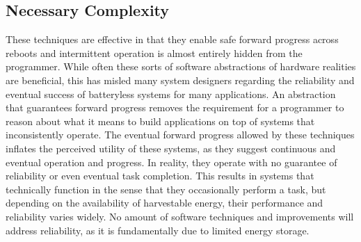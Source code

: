 \subsection{Necessary Complexity}
These techniques are effective in that they enable safe forward progress across reboots and intermittent operation is almost entirely hidden from the programmer.
While often these sorts of software abstractions of hardware realities are beneficial, this has misled many system designers regarding the reliability and eventual success of batteryless systems for many applications.
An abstraction that guarantees forward progress removes the requirement for a programmer to
reason about what it means to build applications on top of systems that inconsistently operate.
The eventual forward progress allowed by these techniques inflates the perceived utility of these systems,
as they suggest continuous and eventual operation and progress. In reality, they operate with no guarantee of reliability or even eventual task completion.
This results in systems that technically function in the sense that they occasionally perform a task, but depending on the availability of harvestable energy, their performance and reliability varies widely.
No amount of software techniques and improvements will address reliability, as it is fundamentally due to limited energy storage.



